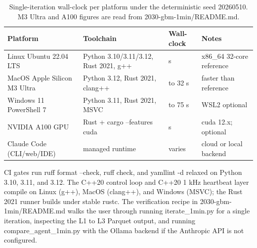 \begin{table}[H]
\centering
\caption{Single-iteration wall-clock per platform under the
deterministic seed 20260510. M3 Ultra and A100 figures are read
from 2030-gbm-1min/README.md.}
\label{tab:platforms}
\begin{tabular}{>{\raggedright\arraybackslash}p{4.0cm}
                >{\raggedright\arraybackslash}p{3.8cm}
                >{\raggedright\arraybackslash}p{2.6cm}
                >{\raggedright\arraybackslash}p{2.6cm}}
\toprule
\textbf{Platform} & \textbf{Toolchain} & \textbf{Wall-clock} & \textbf{Notes} \\
\midrule
Linux Ubuntu 22.04 LTS & Python 3.10/3.11/3.12, Rust 2021, g++ & 60 s & x86_64 32-core reference \\
MacOS Apple Silicon M3 Ultra & Python 3.12, Rust 2021, clang++ & 26 to 32 s & faster than reference \\
Windows 11 PowerShell 7 & Python 3.11, Rust 2021, MSVC & 60 to 75 s & WSL2 optional \\
NVIDIA A100 GPU & Rust + cargo --features cuda & 12 s & cuda 12.x; optional \\
Claude Code (CLI/web/IDE) & managed runtime & varies & cloud or local backend \\
\bottomrule
\end{tabular}
\end{table}

CI gates run ruff format --check, ruff check, and yamllint -d
relaxed on Python 3.10, 3.11, and 3.12. The C++20 control loop and
C++20 1 kHz heartbeat layer compile on Linux (g++), MacOS (clang++),
and Windows (MSVC); the Rust 2021 runner builds under stable rustc.
The verification recipe in 2030-gbm-1min/README.md walks the user
through running iterate_1min.py for a single iteration, inspecting
the L1 to L3 Parquet output, and running compare_agent_1min.py with
the Ollama backend if the Anthropic API is not configured.
